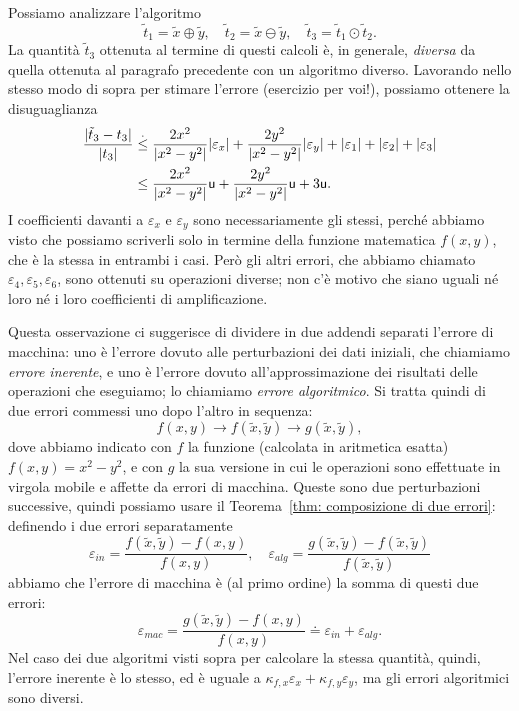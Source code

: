 \documentclass[a4paper]{report}
\DeclarePairedDelimiter{\abs}{\lvert}{\rvert}
\theoremstyle{definition}
\theoremstyle{remark}
\begin{document}
Possiamo analizzare l'algoritmo
\[
\tilde{t}_1 = \tilde{x} \oplus \tilde{y}, \quad \tilde{t}_2 = \tilde{x} \ominus \tilde{y}, \quad \tilde{t}_3 = \tilde{t}_1 \odot \tilde{t}_2.
\]
La quantità $\tilde{t}_3$ ottenuta al termine di questi calcoli è, in generale, \emph{diversa} da quella ottenuta al paragrafo precedente con un algoritmo diverso. Lavorando nello stesso modo di sopra per stimare l'errore (esercizio per voi!), possiamo ottenere la disuguaglianza
\begin{align}
    \frac{\abs{\tilde{t}_3-t_3}}{\abs{t_3}} &\stackrel{.}{\leq} \frac{2x^2}{\abs{x^2-y^2}} \abs{\varepsilon_x} 
    + \frac{2y^2}{\abs{x^2-y^2}} \abs{\varepsilon_y}
    + \abs{\varepsilon_1}+\abs{\varepsilon_2}+\abs{\varepsilon_3} \nonumber\\
    &\leq \frac{2x^2}{\abs{x^2-y^2}} \mathsf{u} + \frac{2y^2}{\abs{x^2-y^2}} \mathsf{u} + 3\mathsf{u}. \label{esempiox2y2bis}
\end{align}
I coefficienti davanti a $\varepsilon_x$ e $\varepsilon_y$ sono necessariamente gli stessi, perché abbiamo visto che possiamo scriverli solo in termine della funzione matematica $f(x,y)$, che è la stessa in entrambi i casi. Però gli altri errori, che abbiamo chiamato $\varepsilon_4,\varepsilon_5,\varepsilon_6$, sono ottenuti su operazioni diverse; non c'è motivo che siano uguali né loro né i loro coefficienti di amplificazione.

Questa osservazione ci suggerisce di dividere in due addendi separati l'errore di macchina: uno è l'errore dovuto alle perturbazioni dei dati iniziali, che chiamiamo \emph{errore inerente}, e uno è l'errore dovuto all'approssimazione dei risultati delle operazioni che eseguiamo; lo chiamiamo \emph{errore algoritmico}. Si tratta quindi di due errori commessi uno dopo l'altro in sequenza:
\[
f(x,y) \to f(\tilde{x},\tilde{y}) \to g(\tilde{x},\tilde{y}),
\]
dove abbiamo indicato con $f$ la funzione (calcolata in aritmetica esatta) $f(x,y) = x^2-y^2$, e con $g$ la sua versione in cui le operazioni sono effettuate in virgola mobile e affette da errori di macchina. Queste sono due perturbazioni successive, quindi possiamo usare il Teorema~\ref{thm: composizione di due errori}: definendo i due errori separatamente
\[
\varepsilon_{in} = \frac{f(\tilde{x},\tilde{y}) - f(x,y)}{f(x,y)}, \quad \varepsilon_{alg} = \frac{g(\tilde{x},\tilde{y}) - f(\tilde{x},\tilde{y})}{f(\tilde{x},\tilde{y})}
\]
abbiamo che l'errore di macchina è (al primo ordine) la somma di questi due errori:
\[
\varepsilon_{mac} = \frac{g(\tilde{x},\tilde{y}) - f(x,y)}{f(x,y)} \doteq \varepsilon_{in} + \varepsilon_{alg}.
\]
Nel caso dei due algoritmi visti sopra per calcolare la stessa quantità, quindi, l'errore inerente è lo stesso, ed è uguale a $\kappa_{f,x}\varepsilon_x + \kappa_{f,y}\varepsilon_y$, ma gli errori algoritmici sono diversi.
\end{document}

